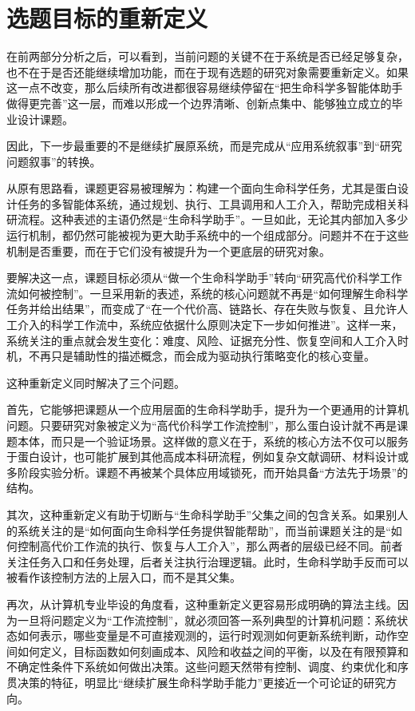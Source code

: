 \section{选题目标的重新定义}

在前两部分分析之后，可以看到，当前问题的关键不在于系统是否已经足够复杂，也不在于是否还能继续增加功能，而在于现有选题的研究对象需要重新定义。如果这一点不改变，那么后续所有改进都很容易继续停留在“把生命科学多智能体助手做得更完善”这一层，而难以形成一个边界清晰、创新点集中、能够独立成立的毕业设计课题。

因此，下一步最重要的不是继续扩展原系统，而是完成从“应用系统叙事”到“研究问题叙事”的转换。

从原有思路看，课题更容易被理解为：构建一个面向生命科学任务，尤其是蛋白设计任务的多智能体系统，通过规划、执行、工具调用和人工介入，帮助完成相关科研流程。这种表述的主语仍然是“生命科学助手”。一旦如此，无论其内部加入多少运行机制，都仍然可能被视为更大助手系统中的一个组成部分。问题并不在于这些机制是否重要，而在于它们没有被提升为一个更底层的研究对象。

要解决这一点，课题目标必须从“做一个生命科学助手”转向“研究高代价科学工作流如何被控制”。一旦采用新的表述，系统的核心问题就不再是“如何理解生命科学任务并给出结果”，而变成了“在一个代价高、链路长、存在失败与恢复、且允许人工介入的科学工作流中，系统应依据什么原则决定下一步如何推进”。这样一来，系统关注的重点就会发生变化：难度、风险、证据充分性、恢复空间和人工介入时机，不再只是辅助性的描述概念，而会成为驱动执行策略变化的核心变量。

这种重新定义同时解决了三个问题。

首先，它能够把课题从一个应用层面的生命科学助手，提升为一个更通用的计算机问题。只要研究对象被定义为“高代价科学工作流控制”，那么蛋白设计就不再是课题本体，而只是一个验证场景。这样做的意义在于，系统的核心方法不仅可以服务于蛋白设计，也可能扩展到其他高成本科研流程，例如复杂文献调研、材料设计或多阶段实验分析。课题不再被某个具体应用域锁死，而开始具备“方法先于场景”的结构。

其次，这种重新定义有助于切断与“生命科学助手”父集之间的包含关系。如果别人的系统关注的是“如何面向生命科学任务提供智能帮助”，而当前课题关注的是“如何控制高代价工作流的执行、恢复与人工介入”，那么两者的层级已经不同。前者关注任务入口和任务处理，后者关注执行治理逻辑。此时，生命科学助手反而可以被看作该控制方法的上层入口，而不是其父集。

再次，从计算机专业毕设的角度看，这种重新定义更容易形成明确的算法主线。因为一旦将问题定义为“工作流控制”，就必须回答一系列典型的计算机问题：系统状态如何表示，哪些变量是不可直接观测的，运行时观测如何更新系统判断，动作空间如何定义，目标函数如何刻画成本、风险和收益之间的平衡，以及在有限预算和不确定性条件下系统如何做出决策。这些问题天然带有控制、调度、约束优化和序贯决策的特征，明显比“继续扩展生命科学助手能力”更接近一个可论证的研究方向。

